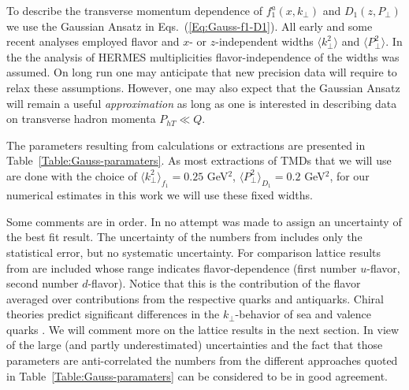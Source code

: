 \documentclass[a4paper,11pt]{article}
\newcommand{\la}{\langle}
\newcommand{\ra}{\rangle}
\def\Phperp{P_{hT}}
\def\kperp{k_\perp}
\def\pperp{P_\perp}
\def\avkperp{\la \kperp^2 \ra}
\def\avpperp{\la \pperp^2 \ra}
\begin{document}
To describe the transverse momentum dependence of $f_1^a(x,k_\perp)$ 
and $D_1(z,P_\perp)$ we use the Gaussian Ansatz in 
Eqs.~(\ref{Eq:Gauss-f1-D1}). All early 
\cite{Anselmino:2005nn,Collins:2005ie,D'Alesio:2007jt,Schweitzer:2010tt}
and some recent \cite{Signori:2013mda} analyses employed flavor and 
$x$- or $z$-independent widths $\avkperp$ and $\avpperp$.
In the the analysis \cite{Anselmino:2013lza} 
of HERMES multiplicities flavor-independence of the widths was 
assumed. On long run one may anticipate that new precision data will 
require to relax these assumptions. However, one may also expect that the 
Gaussian Ansatz will remain a useful {\it approximation} as long as one is 
interested in describing data on transverse hadron momenta $\Phperp \ll Q $. 

The parameters resulting from calculations or extractions are presented in
Table~\ref{Table:Gauss-paramaters}. 
As most extractions of TMDs that we will use are done with the choice of 
$\avkperp_{f_1} = 0.25$ GeV$^2$, $\avpperp_{D_1}= 0.2$ GeV$^2$, for our numerical estimates in this work  we will use these fixed widths.

Some comments are in order.
In \cite{Anselmino:2005nn} no attempt was made to assign an uncertainty of the 
best fit result. The uncertainty of the numbers from \cite{Schweitzer:2010tt}
includes only the statistical error, but no systematic uncertainty.
For comparison lattice results from \cite{Hagler:2009mb} are included
whose range indicates flavor-dependence 
(first number $u$-flavor,
second number $d$-flavor). 
Notice that this is the contribution of the flavor averaged
over contributions from the respective quarks and antiquarks.
Chiral theories predict significant differences in the $\kperp$-behavior
of sea and valence quarks \cite{Schweitzer:2012hh}.
We will comment more on the lattice results in the next section.
In view of the large (and partly underestimated) uncertainties and the 
fact that those parameters are anti-correlated the numbers from the 
different approaches quoted in Table~\ref{Table:Gauss-paramaters} 
can be considered to be in good agreement. 
\end{document}
